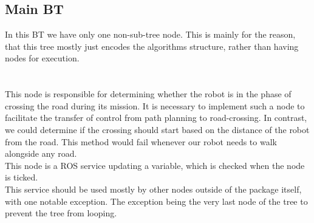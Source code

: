     \subsection{Main BT}
        In this BT we have only one non-sub-tree node. This is mainly for the reason, that this tree mostly just encodes the algorithms structure, rather than having nodes for execution.\\\\
        \\
            This node is responsible for determining whether the robot is in the phase of crossing the road during its mission. It is necessary to implement such a node to facilitate the transfer of control from path planning to road-crossing. In contrast, we could determine if the crossing should start based on the distance of the robot from the road. This method would fail whenever our robot needs to walk alongside any road.\\
            This node is a ROS service updating a variable, which is checked when the node is ticked.\\
            This service should be used mostly by other nodes outside of the package itself, with one notable exception. The exception being the very last node of the tree to prevent the tree from looping.
    
    
    
    